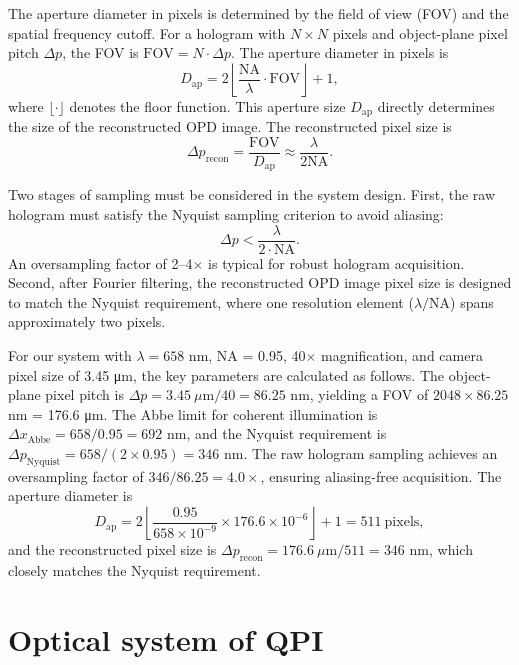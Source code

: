 The aperture diameter in pixels is determined by the field of view (FOV) and the spatial frequency cutoff. For a hologram with $N \times N$ pixels and object-plane pixel pitch $\Delta p$, the FOV is $\mathrm{FOV} = N \cdot \Delta p$. The aperture diameter in pixels is
\begin{equation}
D_{\mathrm{ap}} = 2 \left\lfloor \frac{\mathrm{NA}}{\lambda} \cdot \mathrm{FOV} \right\rfloor + 1,
\end{equation}
where $\lfloor \cdot \rfloor$ denotes the floor function. This aperture size $D_{\mathrm{ap}}$ directly determines the size of the reconstructed OPD image. The reconstructed pixel size is
\begin{equation}
\Delta p_{\mathrm{recon}} = \frac{\mathrm{FOV}}{D_{\mathrm{ap}}} \approx \frac{\lambda}{2\mathrm{NA}}.
\end{equation}

Two stages of sampling must be considered in the system design. First, the raw hologram must satisfy the Nyquist sampling criterion to avoid aliasing:
\begin{equation}
\Delta p < \frac{\lambda}{2 \cdot \mathrm{NA}}.
\end{equation}
An oversampling factor of 2--4$\times$ is typical for robust hologram acquisition. Second, after Fourier filtering, the reconstructed OPD image pixel size is designed to match the Nyquist requirement, where one resolution element ($\lambda/\mathrm{NA}$) spans approximately two pixels.

For our system with $\lambda = 658$ nm, NA = 0.95, 40$\times$ magnification, and camera pixel size of 3.45 μm, the key parameters are calculated as follows. The object-plane pixel pitch is $\Delta p = 3.45~\mu\mathrm{m}/40 = 86.25$ nm, yielding a FOV of $2048 \times 86.25$ nm = 176.6 μm. The Abbe limit for coherent illumination is $\Delta x_{\mathrm{Abbe}} = 658/0.95 = 692$ nm, and the Nyquist requirement is $\Delta p_{\mathrm{Nyquist}} = 658/(2 \times 0.95) = 346$ nm. The raw hologram sampling achieves an oversampling factor of $346/86.25 = 4.0\times$, ensuring aliasing-free acquisition. The aperture diameter is
\begin{equation}
D_{\mathrm{ap}} = 2\left\lfloor \frac{0.95}{658 \times 10^{-9}} \times 176.6 \times 10^{-6} \right\rfloor + 1 = 511~\mathrm{pixels},
\end{equation}
and the reconstructed pixel size is $\Delta p_{\mathrm{recon}} = 176.6~\mu\mathrm{m}/511 = 346$ nm, which closely matches the Nyquist requirement.
\section{Optical system of QPI}


